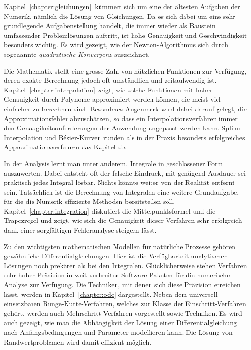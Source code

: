 Kapitel~\ref{chapter:gleichungen} kümmert sich um eine der ältesten
Aufgaben der Numerik, nämlich die Lösung von Gleichungen.
Da es sich dabei um eine sehr grundlegende Aufgabenstellung handelt,
die immer wieder als Baustein umfassender Problemlösungen auftritt,
ist hohe Genauigkeit und Geschwindigkeit besonders wichtig.
Es wird gezeigt, wie der Newton-Algorithmus sich durch sogenannte
{\em quadratische Konvergenz} auszeichnet.
%

Die Mathematik stellt eine grosse Zahl von nützlichen Funktionen zur
Verfügung, deren exakte Berechnung jedoch oft umständlich und
zeitaufwendig ist.
Kapitel~\ref{chapter:interpolation} zeigt, wie solche Funktionen
mit hoher Genauigkeit durch Polynome approximiert werden können,
die meist viel einfacher zu berechnen sind.
Besonderes Augenmerk wird dabei darauf gelegt, die Approximationsfehler
abzuschätzen, so dass ein Interpolationsverfahren immer den
Genaugikeitsanforderungen der Anwendung angepasst werden kann.
Spline-Interpolation und Bézier-Kurven runden als in der Praxis besonders
erfolgreiches Approximationsverfahren das Kapitel ab.

In der Analysis lernt man unter anderem, Integrale in geschlossener
Form auszuwerten.
Dabei entsteht oft der falsche Eindruck, mit genügend Ausdauer sei praktisch
jedes Integral lösbar.
Nichts könnte weiter von der Realität entfernt sein.
Tatsächlich ist die Berechnung von Integralen eine weitere Grundaufgabe,
für die die Numerik effiziente Methoden bereitstellen soll.
Kapitel~\ref{chapter:integration} diskutiert die Mittelpunktsformel und
die Trapezregel und zeigt, wie sich die Genauigkeit dieser Verfahren
sehr erfolgreich dank einer sorgfältigen Fehleranalyse steigern lässt.

Zu den wichtigsten mathematischen Modellen für natürliche Prozesse
gehören gewöhnliche Differentialgleichungen.
Hier ist die Verfügbarkeit analytischer Lösungen noch prekärer als
bei den Integralen.
Glücklicherweise stehen Verfahren sehr hoher Präzision in weit
verbreiten Software-Paketen für die numerische Analyse zur Verfügung.
Die Techniken, mit denen sich diese Präzision erreichen lässt,
werden in Kapitel~\ref{chapter:ode} dargestellt.
Neben dem universell einsetzbaren Runge-Kutte-Verfahren, welches zur
Klasse der Einschritt-Verfahren gehört, werden auch Mehrschritt-Verfahren
vorgestellt sowie Techniken.
Es wird auch gezeigt, wie man die Abhängigkeit der Lösung einer 
Differentialgleichung nach Anfangsbedingungen und Parameter modellieren
kann.
Die Lösung von Randwertproblemen wird damit effizient möglich.

